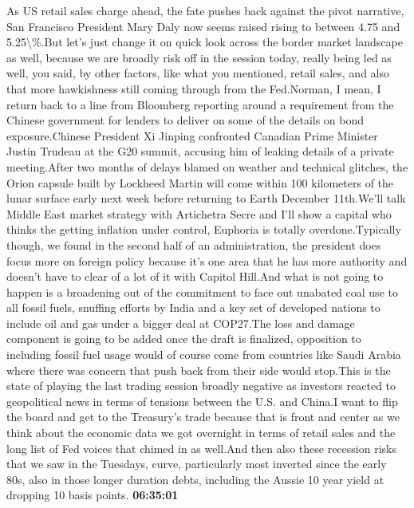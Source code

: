 \documentclass{article}%
\begin{document}
As US retail sales charge ahead, the fate pushes back against the pivot narrative, San Francisco President Mary Daly now seems raised rising to between 4.75 and 5.25\textbackslash{}\%.But let's just change it on quick look across the border market landscape as well, because we are broadly risk off in the session today, really being led as well, you said, by other factors, like what you mentioned, retail sales, and also that more hawkishness still coming through from the Fed.Norman, I mean, I return back to a line from Bloomberg reporting around a requirement from the Chinese government for lenders to deliver on some of the details on bond exposure.Chinese President Xi Jinping confronted Canadian Prime Minister Justin Trudeau at the G20 summit, accusing him of leaking details of a private meeting.After two months of delays blamed on weather and technical glitches, the Orion capsule built by Lockheed Martin will come within 100 kilometers of the lunar surface early next week before returning to Earth December 11th.We'll talk Middle East market strategy with Artichetra Secre and I'll show a capital who thinks the getting inflation under control, Euphoria is totally overdone.Typically though, we found in the second half of an administration, the president does focus more on foreign policy because it's one area that he has more authority and doesn't have to clear of a lot of it with Capitol Hill.And what is not going to happen is a broadening out of the commitment to face out unabated coal use to all fossil fuels, snuffing efforts by India and a key set of developed nations to include oil and gas under a bigger deal at COP27.The loss and damage component is going to be added once the draft is finalized, opposition to including fossil fuel usage would of course come from countries like Saudi Arabia where there was concern that push back from their side would stop.This is the state of playing the last trading session broadly negative as investors reacted to geopolitical news in terms of tensions between the U.S. and China.I want to flip the board and get to the Treasury's trade because that is front and center as we think about the economic data we got overnight in terms of retail sales and the long list of Fed voices that chimed in as well.And then also these recession risks that we saw in the Tuesdays, curve, particularly most inverted since the early 80s, also in those longer duration debts, including the Aussie 10 year yield at dropping 10 basis points.%
\textbf{06:35:01}%
\newline%
\end{document}
